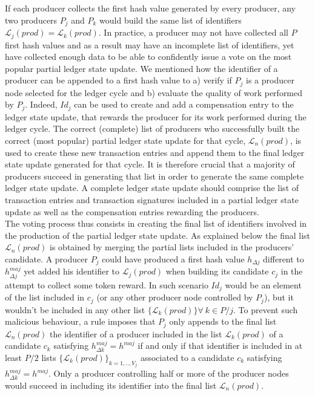 \documentclass{article}
\begin{document}
If each producer collects the first hash value generated by every producer, any two producers $P_j$ and $P_k$ would build the same list of identifiers $\mathcal{L}_j(prod) = \mathcal{L}_k(prod)$. In practice, a producer may not have collected all $P$ first hash values and as a result may have an incomplete list of identifiers, yet have collected enough data to be able to confidently issue a vote on the most popular partial ledger state update. We mentioned how the identifier of a producer can be appended to a first hash value to a) verify if $P_j$ is a producer node selected for the ledger cycle and b) evaluate the quality of work performed by $P_j$. Indeed, $Id_j$ can be used to create and add a compensation entry to the ledger state update, that rewards the producer for its work performed during the ledger cycle. The correct (complete) list of producers who successfully built the correct (most popular) partial ledger state update for that cycle, $\mathcal{L}_n(prod)$, is used to create these new transaction entries and append them to the final ledger state update generated for that cycle. It is therefore crucial that a majority of producers succeed in generating that list in order to generate the same complete ledger state update. A complete ledger state update should comprise the list of transaction entries and transaction signatures included in a partial ledger state update as well as the compensation entries rewarding the producers.\\ 

The voting process thus consists in creating the final list of identifiers involved in the production of the partial ledger state update. As explained below the final list $\mathcal{L}_n(prod)$ is obtained by merging the partial lists included in the producers' candidate. A producer $P_j$ could have produced a first hash value $h_{\Delta j}$ different to $h^{maj}_{\Delta j}$ yet added his identifier to $\mathcal{L}_j(prod)$ when building its candidate $c_j$ in the attempt to collect some token reward. In such scenario $Id_j$ would be an element of the list included in $c_j$ (or any other producer node controlled by $P_j$), but it wouldn't be included in any other list $\{\mathcal{L}_k(prod)\} \forall~k \in P/j$. To prevent such malicious behaviour, a rule imposes that $P_j$ only appends to the final list $\mathcal{L}_n(prod)$ the identifier of a producer included in the list $\mathcal{L}_k(prod)$ of a candidate $c_k$ satisfying $h^{maj}_{\Delta k} = h^{maj}$ if and only if that identifier is included in at least $P/2$ lists $\{\mathcal{L}_{k}(prod)\}_{k=1,..,V_j}$ associated to a candidate $c_{k}$ satisfying $h^{maj}_{\Delta k} = h^{maj}$. Only a producer controlling half or more of the producer nodes would succeed in including its identifier into the final list $\mathcal{L}_n(prod)$.\\
\end{document}

